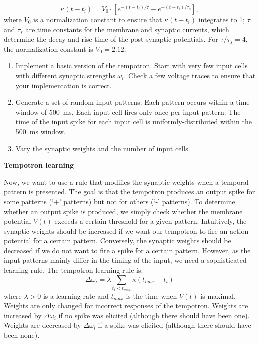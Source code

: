 \documentclass[12pt]{article}
\begin{document}
$$\kappa (t -
t_i)=V_0\cdot\left[e^{-(t-t_i)/\tau}-e^{-(t-t_i)/\tau_s}\right],$$
where $V_0$ is a normalization constant to ensure that $\kappa (t -
t_i)$ integrates to 1; $\tau$ and $\tau_s$ are time constants for the membrane
and synaptic currents,  which determine the decay and
rise time of the post-synaptic potentials. For $\tau/\tau_s = 4$, the
normalization constant is  $V_0=2.12$.

\begin{enumerate}
   \item Implement a basic version of the tempotron. Start with very
   few input cells with different synaptic strengths $\omega_i$. Check
   a few voltage traces to ensure that your implementation is correct.
   \item Generate a set of random input patterns. Each pattern occurs
   within a time window of 500~ms. Each input cell fires only once
   per input pattern. The time of the input spike for each input cell
   is uniformly-distributed within the 500~ms window.
   \item Vary the synaptic weights and the number of input cells.
\end{enumerate}    

{\bf Tempotron learning} 

Now, we want to use a rule that modifies
the synaptic weights when a temporal pattern is presented. The goal is
that the tempotron produces an output spike for some patterns (`+'
patterns) but not for others (`-' patterns). To determine whether an
output spike is produced, we simply check whether the membrane
potential $V(t)$ exceeds a certain threshold for a given pattern.
Intuitively, the synaptic weights should be increased if we want our
tempotron to fire an action potential for a certain pattern.
Conversely, the synaptic weights should be decreased if we do not want
to fire a spike for a certain pattern. However, as the input patterns
mainly differ in the timing of the input, we need a sophisticated
learning rule. The tempotron learning rule is:
  $$ \Delta\omega_i = \lambda \sum_{t_i<t_{max}} \kappa
  (t_{max}-t_i)$$ where $\lambda>0$ is a learning rate and $t_{max}$
  is the time when $V(t)$ is maximal. Weights are only changed for
  incorrect responses of the tempotron. Weights are increased by
  $\Delta\omega_i$ if no spike was elicited (although there should have
  been one). Weights are decreased by $\Delta\omega_i$ if a spike was
  elicited (although there should have been none).
\end{document}
